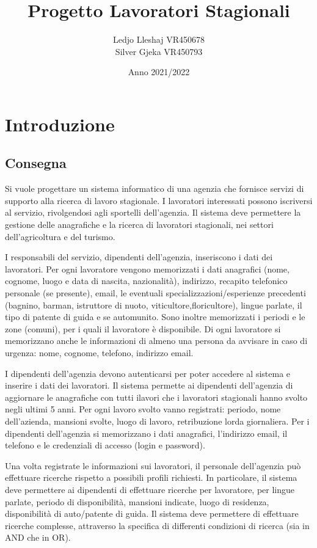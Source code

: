 \documentclass[ 4paper,11pt,openany]{book}
\title{Progetto Lavoratori Stagionali}
\author{Ledjo Lleshaj VR450678\\Silver Gjeka VR450793}
\date{Anno 2021/2022}
\begin{document}
\frontmatter
\maketitle
\tableofcontents 

\mainmatter
\chapter{Introduzione}
\section{Consegna}
Si vuole progettare un sistema informatico di una agenzia che fornisce servizi di supporto alla ricerca di lavoro stagionale. I lavoratori interessati possono iscriversi al servizio, rivolgendosi agli sportelli dell’agenzia. Il sistema deve permettere la gestione delle anagrafiche e la ricerca di lavoratori
stagionali, nei settori dell’agricoltura e del turismo. 
	
I responsabili del servizio, dipendenti dell’agenzia, inseriscono i dati dei lavoratori. 
Per ogni lavoratore vengono memorizzati i dati anagrafici (nome, cognome, luogo e data di nascita, nazionalità), indirizzo, recapito telefonico personale (se presente), email, le eventuali
specializzazioni/esperienze precedenti (bagnino, barman, istruttore di nuoto, viticultore,floricultore), lingue parlate, il tipo di patente di guida e se automunito. Sono inoltre memorizzati i periodi e le zone (comuni), per i quali il lavoratore è disponibile. Di ogni lavoratore si memorizzano anche le informazioni di almeno una persona da avvisare in caso di urgenza: nome, cognome, telefono, indirizzo email. 
	
I dipendenti dell’agenzia devono autenticarsi per poter accedere al sistema e inserire i dati dei lavoratori. Il sistema permette ai dipendenti dell’agenzia di aggiornare le anagrafiche con tutti ilavori che i lavoratori stagionali hanno svolto negli ultimi 5 anni. 
Per ogni lavoro svolto vanno registrati: periodo, nome dell’azienda, mansioni svolte, luogo di lavoro, retribuzione lorda giornaliera. Per i dipendenti dell’agenzia si memorizzano i dati anagrafici, l’indirizzo email, il telefono e le credenziali di accesso (login e password).
	
Una volta registrate le informazioni sui lavoratori, il personale dell’agenzia può effettuare ricerche rispetto a possibili profili richiesti.
In particolare, il sistema deve permettere ai dipendenti di effettuare ricerche per lavoratore, per lingue parlate, periodo di disponibilità, mansioni indicate, luogo di residenza, disponibilità di auto/patente di guida. Il sistema deve permettere di effettuare ricerche complesse, attraverso la specifica di differenti condizioni di ricerca (sia in AND che in OR).
\pagebreak
	
\end{document}
